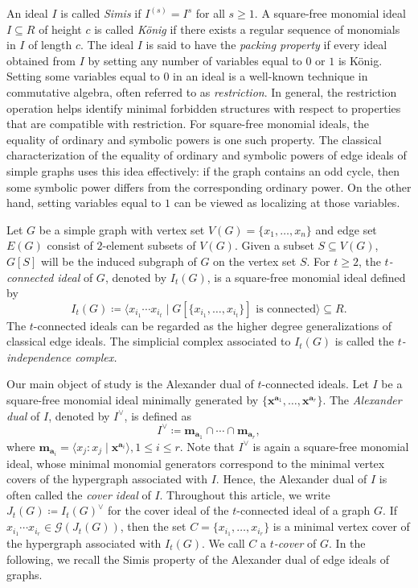 \documentclass[12pt]{amsart}
\def\l{\langle}
\def\r{\rangle}
\begin{document}
An ideal $I$ is called \emph{Simis} if $I^{(s)} = I^s$ for all $s \geq 1$. A square-free monomial ideal $I\subseteq R$ of height $c$ is called \emph{K\"onig} if there exists a regular sequence of monomials in $I$ of length $c$. The ideal $I$ is said to have the \emph{packing property} if every ideal obtained from $I$ by setting any number of variables equal to $0$ or $1$ is K\"onig. Setting some variables equal to $0$ in an ideal is a well-known technique in commutative algebra, often referred to as \emph{restriction}. In general, the restriction operation helps identify minimal forbidden structures with respect to properties that are compatible with restriction. For square-free monomial ideals, the equality of ordinary and symbolic powers is one such property. The classical characterization of the equality of ordinary and symbolic powers of edge ideals of simple graphs uses this idea effectively: if the graph contains an odd cycle, then some symbolic power differs from the corresponding ordinary power. On the other hand, setting variables equal to $1$ can be viewed as localizing at those variables.


Let $G$ be a simple graph with vertex set $V(G)=\{x_1,\dots , x_n\}$ and edge set $E(G)$ consist of $2$-element subsets of $V(G)$. Given a subset $S\subseteq V(G)$, $G[S]$ will be the induced subgraph of $G$ on the vertex set $S$. For $t\geq 2$, the \emph{$t$-connected ideal} of $G$, denoted by $I_t(G)$, is a square-free monomial ideal defined by 
\[
I_t(G)\coloneq \l x_{i_1}\cdots x_{i_t}\mid G[\{x_{i_1},\dots , x_{i_t}\}] \text{ is connected}\r \subseteq R.
\]
The $t$-connected ideals can be regarded as the higher degree generalizations of classical edge ideals. The simplicial complex associated to $I_t(G)$ is called the \emph{$t$-independence complex.}

Our main object of study is the Alexander dual of $t$-connected ideals. Let $I$ be a square-free monomial ideal minimally generated by $\{ \mathbf{x}^{\mathbf{a}_1}, \dots , \mathbf{x}^{\mathbf{a}_r}\}$. The \emph{Alexander dual} of $I$, denoted by $I^{\vee}$, is defined as 
\[
I^{\vee}\coloneq \mathbf{m}_{\mathbf{a}_1}\cap \cdots \cap \mathbf{m}_{\mathbf{a}_r},
\]
where $\mathbf{m}_{\mathbf{a}_i}=\l x_j: x_j\mid \mathbf{x}^{\mathbf{a}_i}\r, 1\leq i\leq r$. Note that $I^{\vee}$ is again a square-free monomial ideal, whose minimal monomial generators correspond to the minimal vertex covers of the hypergraph associated with $I$. Hence, the Alexander dual of $I$ is often called the \emph{cover ideal} of $I$. Throughout this article, we write $J_t(G)\coloneqq I_t(G)^{\vee}$ for the cover ideal of the $t$-connected ideal of a graph $G$. If $x_{i_1}\cdots x_{i_r}\in \mathcal{G}(J_t(G))$, then the set $C=\{x_{i_1},\dots,x_{i_r}\}$ is a minimal vertex cover of the hypergraph associated with $I_t(G)$. We call $C$ a \emph{$t$-cover} of $G$. In the following, we recall the Simis property of the Alexander dual of edge ideals of graphs.
\end{document}

